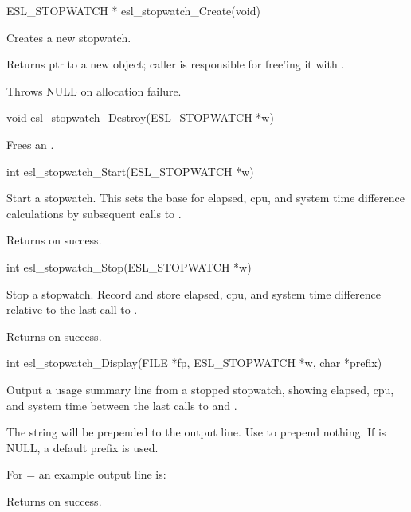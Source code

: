 \begin{sreapi}
\hypertarget{func:esl_stopwatch_Create()}
{\item[ESL\_STOPWATCH * esl\_stopwatch\_Create(void)]}

Creates a new stopwatch.

Returns ptr to a new  object; caller is
responsible for free'ing it with 
.

Throws NULL on allocation failure.


\hypertarget{func:esl_stopwatch_Destroy()}
{\item[void esl\_stopwatch\_Destroy(ESL\_STOPWATCH *w)]}

Frees an .


\hypertarget{func:esl_stopwatch_Start()}
{\item[int esl\_stopwatch\_Start(ESL\_STOPWATCH *w)]}

Start a stopwatch. This sets the base 
for elapsed, cpu, and system time difference
calculations by subsequent calls to
.

Returns  on success.


\hypertarget{func:esl_stopwatch_Stop()}
{\item[int esl\_stopwatch\_Stop(ESL\_STOPWATCH *w)]}

Stop a stopwatch. Record and store elapsed,
cpu, and system time difference relative to the
last call to .

Returns  on success.


\hypertarget{func:esl_stopwatch_Display()}
{\item[int esl\_stopwatch\_Display(FILE *fp, ESL\_STOPWATCH *w, char *prefix)]}

Output a usage summary line from a stopped
stopwatch, showing elapsed, cpu, and system time
between the last calls to 
 and .

The string  will be prepended to the output
line. Use  to prepend nothing. If  is NULL,
a default  prefix is used.

For  =  an example output line is:\\

Returns  on success.


\end{sreapi}
